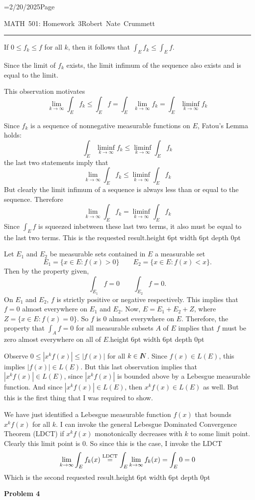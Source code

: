 \footline={2/20/2025\hfill Page \folio}
\def\reals{I\kern-4pt R}
\def\nats{I\kern-4pt N}
\let\oldexists\exists \def\exists{\oldexists \;}
\let\oldforall\forall \def\forall{\oldforall \,}
\def\qed{\vrule height 6pt width 6pt depth 0pt}
\parindent 0pt
\parskip 2mm


MATH~501: Homework~3\hfill Robert~Nate~Crummett
\smallskip
\hrule




If $0\leq f_k\leq f$ for all $k$, then it follows that $\int_Ef_k\leq\int_Ef$.

Since the limit of $f_k$ exists, the limit infimum of the sequence also exists and is equal to the limit.

This observation motivates
$$\lim_{k\to\infty}\int_Ef_k\leq\int_Ef=\int_E\lim_{k\to\infty}f_k=\int_E\liminf_{k\to\infty}f_k$$

Since $f_k$ is a sequence of nonnegative measurable functions on $E$, Fatou's Lemma holds:
$$\int_E\liminf_{k\to\infty}f_k\leq\liminf_{k\to\infty}\int_Ef_k$$
the last two statements imply that
$$\lim_{k\to\infty}\int_Ef_k\leq\liminf_{k\to\infty}\int_Ef_k$$
But clearly the limit infimum of a sequence is always less than or equal to the sequence.
Therefore
$$\lim_{k\to\infty}\int_Ef_k=\liminf_{k\to\infty}\int_Ef_k$$
Since $\int_Ef$ is squeezed inbetween these last two terms, it also must be equal to the last two terms.
This is the requested result.\hfill\qed\kern3pt{}




Let $E_1$ and $E_2$ be measurable sets contained in $E$ a measurable set
$$E_1=\{x\in E:f(x)>0\}\qquad E_2=\{x\in E:f(x)<x\}.$$
Then by the property given,
$$\int_{E_1}f=0\qquad\int_{E_2}f=0.$$
On $E_1$ and $E_2$, $f$ is strictly positive or negative respectively.
This implies that $f=0$ almost everywhere on $E_1$ and $E_2$.
Now, $E = E_1 + E_2 + Z$, where $Z=\{x\in E:f(x)=0\}$.
So $f$ is 0 almost everywhere on $E$.
Therefore, the property that $\int_Af=0$ for all measurable subsets $A$ of $E$ implies that $f$ must be zero almost everywhere on all of $E$.\hfill\qed\kern3pt{}




Observe $0\leq|x^kf(x)|\leq|f(x)|$ for all $k\in\nats$.
Since $f(x)\in L(E)$, this implies $|f(x)|\in L(E)$.
But this last observation implies that $|x^kf(x)|\in L(E)$, since $|x^kf(x)|$ is bounded above by a Lebesgue measurable function.
And since $|x^kf(x)|\in L(E)$, then $x^kf(x)\in L(E)$ as well.
But this is the first thing that I was required to show.

We have just identified a Lebesgue measurable function $f(x)$ that bounds $x^kf(x)$ for all $k$.
I can invoke the general Lebesgue Dominated Convergence Theorem (LDCT) if $x^kf(x)$ monotonically decreases with $k$ to some limit point.
Clearly this limit point is $0$.
So since this is the case, I invoke the LDCT
$$\lim_{k\to\infty}\int_Ef_k(x)\buildrel\rm LDCT\over =\int_E\lim_{k\to\infty}f_k(x)=\int_E0=0$$
Which is the second requested result.\hfill\qed\kern3pt{}

\eject
{\bf Problem 4}



\bye
